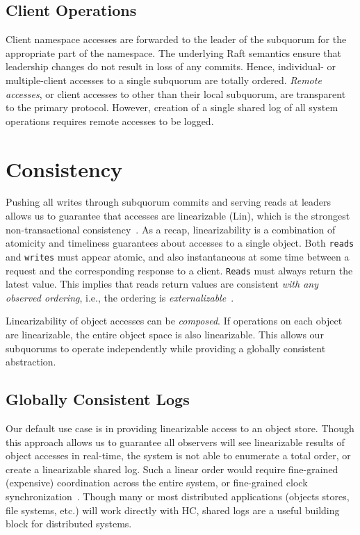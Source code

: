 \subsection{Client Operations}


Client namespace accesses are forwarded to the leader of the subquorum for the appropriate part of the namespace.
The underlying Raft semantics ensure that leadership changes do not result in loss of any commits.
Hence, individual- or multiple-client accesses to a single subquorum are totally ordered.
\emph{Remote accesses}, or client accesses to other than their local subquorum, are transparent to the primary protocol.
However, creation of a single shared log of all system operations requires remote accesses to be logged.

\section{Consistency}

Pushing all writes through subquorum commits and serving reads at leaders allows us to guarantee that accesses are linearizable (Lin), which is the strongest non-transactional consistency~\cite{linearizability,sequential_consistency}.
As a recap, linearizability is a combination of atomicity and timeliness guarantees about accesses to a single object.
Both \texttt{reads} and \texttt{writes} must appear atomic, and also instantaneous at some time between a request and the corresponding response to a client.
\texttt{Reads} must always return the latest value.
This implies that reads return values are consistent \emph{with any observed ordering}, i.e., the ordering is \emph{externalizable}~\cite{externalizable}.

Linearizability of object accesses can be \emph{composed}.
If operations on each object are linearizable, the entire object space is also linearizable.
This allows our subquorums to operate independently while providing a globally consistent abstraction.

\subsection{Globally Consistent Logs}
\label{sec:ch03_log_ordering}

Our default use case is in providing linearizable access to an object store.
Though this approach allows us to guarantee all observers will see linearizable results of object accesses in real-time, the system is not able to enumerate a total order, or create a linearizable shared log.
Such a linear order would require fine-grained (expensive) coordination across the entire system, or fine-grained clock synchronization~\cite{spanner}.
Though many or most distributed applications (objects stores, file systems, etc.) will work directly with HC, shared logs are a useful building block for distributed systems.

